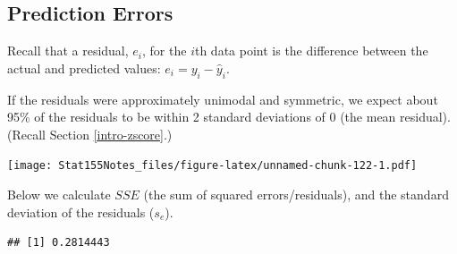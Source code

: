 \documentclass[]{book}
\newenvironment{Shaded}{\begin{snugshade}}{\end{snugshade}}
\newcommand{\CommentTok}[1]{\textcolor[rgb]{0.56,0.35,0.01}{\textit{#1}}}
\newcommand{\DataTypeTok}[1]{\textcolor[rgb]{0.13,0.29,0.53}{#1}}
\newcommand{\DecValTok}[1]{\textcolor[rgb]{0.00,0.00,0.81}{#1}}
\newcommand{\KeywordTok}[1]{\textcolor[rgb]{0.13,0.29,0.53}{\textbf{#1}}}
\newcommand{\NormalTok}[1]{#1}
\newcommand{\OperatorTok}[1]{\textcolor[rgb]{0.81,0.36,0.00}{\textbf{#1}}}
\newcommand{\StringTok}[1]{\textcolor[rgb]{0.31,0.60,0.02}{#1}}
\begin{document}
\hypertarget{prediction-errors}{%
\subsection{Prediction Errors}\label{prediction-errors}}

Recall that a residual, \(e_i\), for the \(i\)th data point is the difference between the actual and predicted values: \(e_i = y_i - \hat{y}_i\).

If the residuals were approximately unimodal and symmetric, we expect about 95\% of the residuals to be within 2 standard deviations of 0 (the mean residual). (Recall Section \ref{intro-zscore}.)

\begin{Shaded}
\end{Shaded}

\texttt{[image: Stat155Notes\_files/figure-latex/unnamed-chunk-122-1.pdf]}

Below we calculate \(SSE\) (the sum of squared errors/residuals), and the standard deviation of the residuals (\(s_e\)).

\begin{Shaded}
\end{Shaded}

\begin{verbatim}
## [1] 0.2814443
\end{verbatim}
\end{document}
